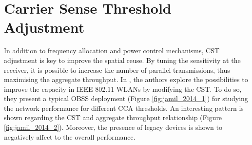 \documentclass[12pt, a4paper,twoside]{tesi_upf}
\begin{document}
		\section{Carrier Sense Threshold Adjustment}
		\label{section:cca}
			In addition to frequency allocation and power control mechanisms, CST adjustment is key to improve the spatial reuse. By tuning the sensitivity at the receiver, it is possible to increase the number of parallel transmissions, thus maximising the aggregate throughput. In \cite{jamil2014improving}, the authors explore the possibilities to improve the capacity in IEEE 802.11 WLANs by modifying the CST. To do so, they present a typical OBSS deployment (Figure \ref{fig:jamil_2014_1}) for studying the network performance for different CCA thresholds. An interesting pattern is shown regarding the CST and aggregate throughput relationship (Figure \ref{fig:jamil_2014_2}). Moreover, the presence of legacy devices is shown to negatively affect to the overall performance.
\end{document}
